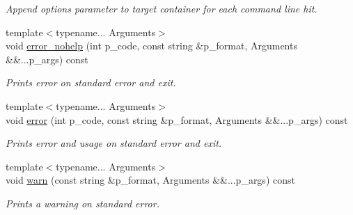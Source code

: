 \begin{DoxyCompactItemize}
\begin{DoxyCompactList}\small\item\em Append option\textquotesingle{}s parameter to target container for each command line hit. \end{DoxyCompactList}\item 
{\footnotesize template$<$typename... Arguments$>$ }\\void \hyperlink{classxtd_1_1Application_a810c6c1924f762fd453555cb91cb35f9}{error\+\_\+nohelp} (int p\+\_\+code, const string \&p\+\_\+format, Arguments \&\&...p\+\_\+args) const 
\begin{DoxyCompactList}\small\item\em Prints error on standard error and exit. \end{DoxyCompactList}\item 
{\footnotesize template$<$typename... Arguments$>$ }\\void \hyperlink{classxtd_1_1Application_adf84f52f1388bef1336d0fb5f6345563}{error} (int p\+\_\+code, const string \&p\+\_\+format, Arguments \&\&...p\+\_\+args) const 
\begin{DoxyCompactList}\small\item\em Prints error and usage on standard error and exit. \end{DoxyCompactList}\item 
{\footnotesize template$<$typename... Arguments$>$ }\\void \hyperlink{classxtd_1_1Application_a931877468f6b948909d596d91d60b7a2}{warn} (const string \&p\+\_\+format, Arguments \&\&...p\+\_\+args) const 
\begin{DoxyCompactList}\small\item\em Prints a warning on standard error. \end{DoxyCompactList}\end{DoxyCompactItemize}
